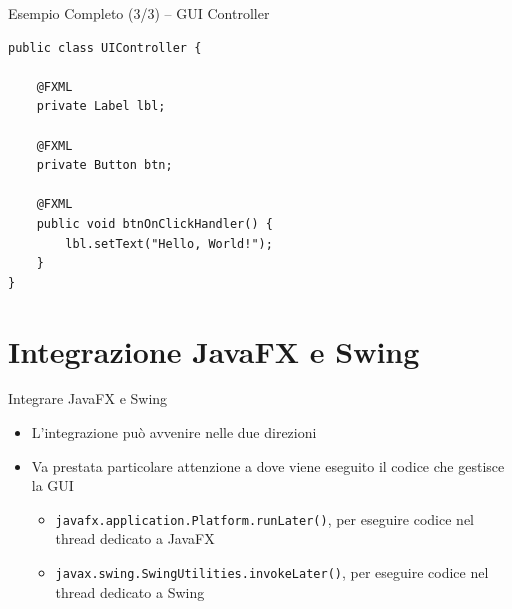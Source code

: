 \documentclass[xcolor=dvipsnames,presentation]{beamer}
\begin{document}
\begin{frame}[fragile]{Esempio Completo (3/3) -- GUI Controller}
\begin{lstlisting}
public class UIController {

	@FXML
	private Label lbl;

	@FXML
	private Button btn;

	@FXML
	public void btnOnClickHandler() {
		lbl.setText("Hello, World!");
	}
}
\end{lstlisting}
\end{frame}

\section{Integrazione JavaFX e Swing}

\begin{frame}{Integrare JavaFX e Swing}
\begin{itemize}
\item L'integrazione può avvenire nelle due direzioni
\item Va prestata particolare attenzione a dove viene eseguito il codice che gestisce la GUI
\begin{itemize}
\item \texttt{javafx.application.Platform.runLater()}, per eseguire codice nel thread dedicato a JavaFX
\item \texttt{javax.swing.SwingUtilities.invokeLater()}, per eseguire codice nel thread dedicato a Swing
\end{itemize}
\end{itemize}
\end{frame}
\end{document}
